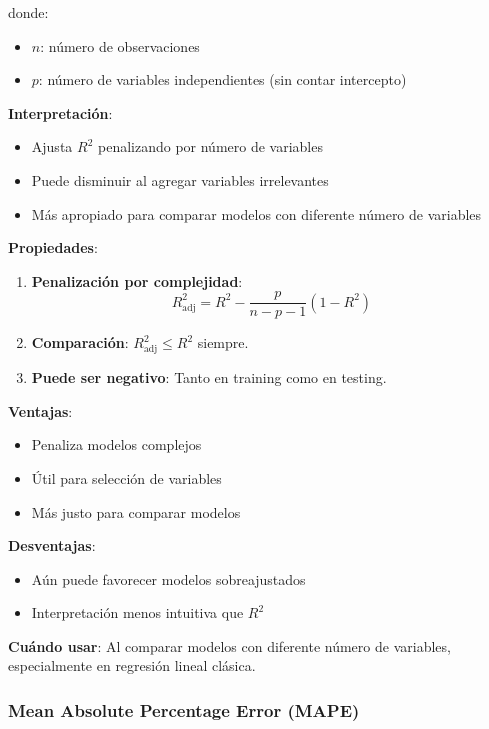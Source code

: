 \documentclass[
  doc,
  floatsintext,
  longtable,
  a4paper,
  nolmodern,
  notxfonts,
  notimes,
  12pt,
  colorlinks=true,linkcolor=blue,citecolor=blue,urlcolor=blue]{apa7}
\providecommand{\tightlist}{%
  \setlength{\itemsep}{0pt}\setlength{\parskip}{0pt}}
\begin{document}
donde:

\begin{itemize}
\tightlist
\item
  \(n\): número de observaciones
\item
  \(p\): número de variables independientes (sin contar intercepto)
\end{itemize}

\textbf{Interpretación}:

\begin{itemize}
\tightlist
\item
  Ajusta \(R^2\) penalizando por número de variables
\item
  Puede disminuir al agregar variables irrelevantes
\item
  Más apropiado para comparar modelos con diferente número de variables
\end{itemize}

\textbf{Propiedades}:

\begin{enumerate}
\def\labelenumi{\arabic{enumi}.}
\item
  \textbf{Penalización por complejidad}: \[
  R^2_{\text{adj}} = R^2 - \frac{p}{n-p-1}(1-R^2)
  \]
\item
  \textbf{Comparación}: \(R^2_{\text{adj}} \leq R^2\) siempre.
\item
  \textbf{Puede ser negativo}: Tanto en training como en testing.
\end{enumerate}

\textbf{Ventajas}:

\begin{itemize}
\tightlist
\item
  Penaliza modelos complejos
\item
  Útil para selección de variables
\item
  Más justo para comparar modelos
\end{itemize}

\textbf{Desventajas}:

\begin{itemize}
\tightlist
\item
  Aún puede favorecer modelos sobreajustados
\item
  Interpretación menos intuitiva que \(R^2\)
\end{itemize}

\textbf{Cuándo usar}: Al comparar modelos con diferente número de
variables, especialmente en regresión lineal clásica.

\subsubsection{Mean Absolute Percentage Error
(MAPE)}\label{mean-absolute-percentage-error-mape}
\end{document}
